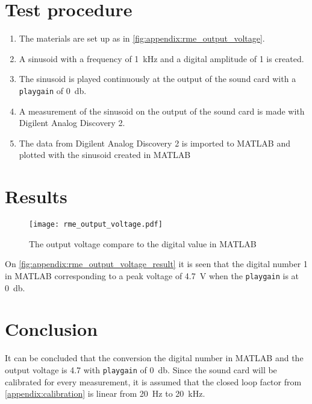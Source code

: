 \section*{Test procedure}


\begin{enumerate}
\item The materials are set up as in \autoref{fig:appendix:rme_output_voltage}.
\item A sinusoid with a frequency of \SI{1}{\kilo\hertz} and a digital amplitude of 1 is created.  
\item The sinusoid is played continuously at the output of the sound card with a \texttt{playgain} of  \SI{0}{\decibel}.
\item  A measurement of the sinusoid on the output of the sound card is made with Digilent Analog Discovery 2.
\item The data from Digilent Analog Discovery 2 is imported to MATLAB and plotted with the sinusoid created in MATLAB
\end{enumerate}

\section*{Results}

\begin{figure}[htbp!]
	\centering
		\texttt{[image: rme\_output\_voltage.pdf]}
		\caption{The output voltage compare to the digital value in MATLAB}
		\label{fig:appendix:rme_output_voltage_result}
\end{figure}

On  \autoref{fig:appendix:rme_output_voltage_result} it is seen that the digital number 1 in MATLAB corresponding to a peak voltage of \SI{4.7}{\volt} when the \texttt{playgain} is at \SI{0}{\decibel}. 

\section*{Conclusion}
It can be concluded that the conversion the digital number in MATLAB and the output voltage is 4.7 with \texttt{playgain} of \SI{0}{\decibel}. Since the sound card will be calibrated for every measurement, it is assumed that the closed loop factor from \autoref{appendix:calibration} is linear from \SI{20}{\hertz} to \SI{20}{\kilo\hertz}. 



